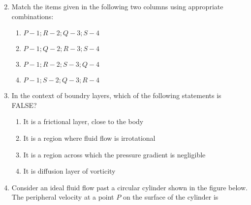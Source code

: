 \documentclass[journal]{IEEEtran}
\begin{document}
\begin{enumerate}
{\begin{multicols}{2}
\begin{enumerate}
{\begin{figure}[H]
\label{fig:my_label}
\end{figure}}
\end{enumerate}
\end{multicols}
}
\item{
Match the items given in the following two columns using appropriate combinations:
\begin{table}[h!]    
  \centering
  
\end{table}
\begin{multicols}{2}
\begin{enumerate}
\item $P-1;R-2;Q-3;S-4$
\item $P-1;Q-2;R-3;S-4$
\item $P-1;R-2;S-3;Q-4$ 
\item $P-1;S-2;Q-3;R-4$
\end{enumerate}
\end{multicols}
}
\item{
In the context of boundry layers, which of the following statements is FALSE?
\begin{enumerate}
\item It is a frictional layer, close to the body
\item It is a region where fluid flow is irrotational 
\item It is a region across which the pressure gradient is negligible 
\item It is diffusion layer of vorticity
\end{enumerate}
}
\item{
Consider an ideal fluid flow past a circular cylinder shown in the figure below. The peripheral velocity at a point $P$ on the surface of the cylinder is
\begin{figure}[H]
\centering
{}%


\end{figure}}
\end{enumerate}
\end{document}

